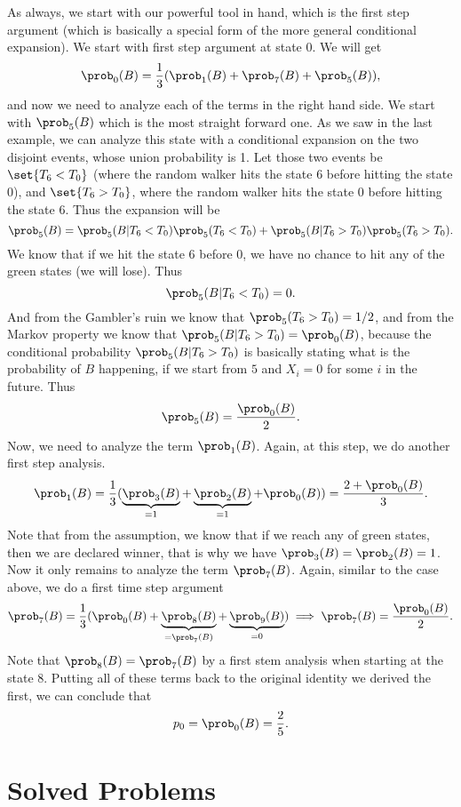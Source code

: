\begin{solution}
	As always, we start with our powerful tool in hand, which is the first step argument (which is basically a special form of the more general conditional expansion). We start with first step argument at state $0$. We will get
	\[ \prob_0(B) = \frac{1}{3} (\prob_1(B) + \prob_7(B) + \prob_5(B) ), \]
	and now we need to analyze each of the terms in the right hand side. We start with $\prob_5(B)$ which is the most straight forward one. As we saw in the last example, we can analyze this state with a conditional expansion on the two disjoint events, whose union probability is 1. Let those two events be $\set{T_6 < T_0}$ (where the random walker hits the state $6$ before hitting the state $0$), and $\set{T_6 > T_0}$, where the random walker hits the state $0$ before hitting the state $6$. Thus the expansion will be
	\[ \prob_5(B) = \prob_5(B|T_6 < T_0) \prob_5(T_6 < T_0) + \prob_5(B|T_6 > T_0)\prob_5(T_6 > T_0). \]
	We know that if we hit the state $6$ before $0$, we have no chance to hit any of the green states (we will lose). Thus
	\[ \prob_5(B|T_6<T_0) = 0. \]
	And from the Gambler's ruin we know that $\prob_5(T_6>T_0) = 1/2$, and from the Markov property we know that $\prob_5(B|T_6>T_0) = \prob_0(B)$, because the conditional probability $\prob_5(B|T_6>T_0)$ is basically stating what is the probability of $B$ happening, if we start from $5$ and $X_i = 0$ for some $i$ in the future. Thus 
	\[ \prob_5(B) = \frac{\prob_0(B)}{2}. \]
	Now, we need to analyze the term $\prob_1(B)$. Again, at this step, we do another first step analysis.
	\[  \prob_1(B) = \frac{1}{3} (\underbrace{\prob_3(B)}_{=1} + \underbrace{\prob_2(B)}_{=1} +\prob_0(B)) = \frac{2+\prob_0(B)}{3}. \]
	Note that from the assumption, we know that if we reach any of green states, then we are declared winner, that is why we have $\prob_3(B) = \prob_2(B) = 1$. Now it only remains to analyze the term $\prob_7(B)$. Again, similar to the case above, we do a first time step argument
	\[ \prob_7(B) = \frac{1}{3} ( \prob_0(B) + \underbrace{\prob_8(B)}_{=\prob_7(B)} + \underbrace{\prob_9(B)}_{=0} ) \implies \prob_7(B) = \frac{\prob_0(B)}{2}.\]
	Note that $\prob_8(B) = \prob_7(B)$ by a first stem analysis when starting at the state $8$. Putting all of these terms back to the original identity we derived the first, we can conclude that 
	\[ p_0 = \prob_0(B) = \frac{2}{5}. \]
\end{solution}







\section{Solved Problems}






